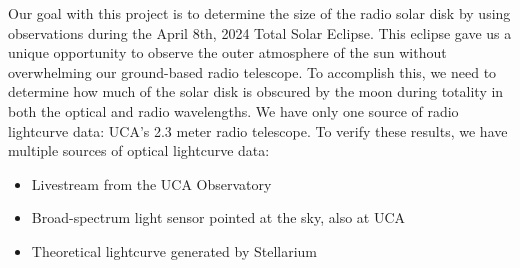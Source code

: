 Our goal with this project is to determine the size of the radio solar disk by using observations during the April 8th, 2024 Total Solar Eclipse.
This eclipse gave us a unique opportunity to observe the outer atmosphere of the sun without overwhelming our ground-based radio telescope.
To accomplish this, we need to determine how much of the solar disk is obscured by the moon during totality in both the optical and radio wavelengths.
We have only one source of radio lightcurve data: UCA's 2.3 meter radio telescope.
To verify these results, we have multiple sources of optical lightcurve data:
\begin{itemize}
    \item Livestream from the UCA Observatory
    \item Broad-spectrum light sensor pointed at the sky, also at UCA
    \item Theoretical lightcurve generated by Stellarium
\end{itemize}%
